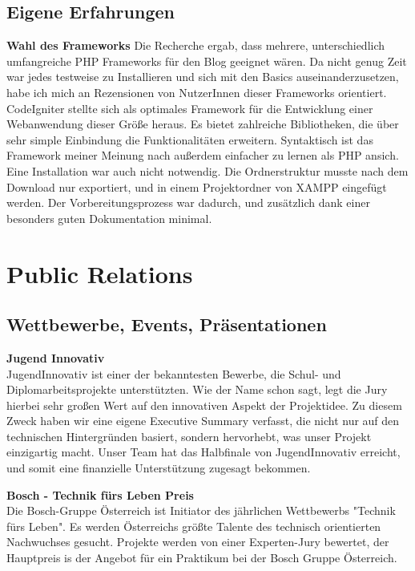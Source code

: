 {  \subsection{Eigene Erfahrungen}
  \textbf{Wahl des Frameworks}
  Die Recherche ergab, dass mehrere, unterschiedlich umfangreiche PHP Frameworks für den Blog geeignet wären. Da nicht genug Zeit war jedes testweise zu Installieren und
  sich mit den Basics auseinanderzusetzen, habe ich mich an Rezensionen von NutzerInnen dieser Frameworks orientiert. CodeIgniter stellte sich als optimales Framework für
  die Entwicklung einer Webanwendung dieser Größe heraus. Es bietet zahlreiche Bibliotheken, die über sehr simple Einbindung die Funktionalitäten erweitern. Syntaktisch ist
  das Framework meiner Meinung nach außerdem einfacher zu lernen als PHP ansich. Eine Installation war auch nicht notwendig. Die Ordnerstruktur musste nach dem Download nur
  exportiert, und in einem Projektordner von XAMPP eingefügt werden. Der Vorbereitungsprozess war dadurch, und zusätzlich dank einer besonders guten Dokumentation minimal.

\section{Public Relations}

  \subsection{Wettbewerbe, Events, Präsentationen}

    \textbf{Jugend Innovativ}\\
    JugendInnovativ ist einer der bekanntesten Bewerbe, die Schul- und Diplomarbeitsprojekte
    unterstützten. Wie der Name schon sagt, legt die Jury hierbei sehr großen Wert auf den innovativen
    Aspekt der Projektidee. Zu diesem Zweck haben wir eine eigene Executive Summary verfasst, die nicht
    nur auf den technischen Hintergründen basiert, sondern hervorhebt, was unser Projekt einzigartig
    macht. Unser Team hat das Halbfinale von JugendInnovativ erreicht, und somit eine finanzielle Unterstützung
    zugesagt bekommen.

    \textbf{Bosch - Technik fürs Leben Preis}\\
    Die Bosch-Gruppe Österreich ist Initiator des jährlichen Wettbewerbs "Technik fürs Leben". Es werden Österreichs
    größte Talente des technisch orientierten Nachwuchses gesucht. Projekte werden von einer Experten-Jury bewertet,
    der Hauptpreis is der Angebot für ein Praktikum bei der Bosch Gruppe Österreich.

}
